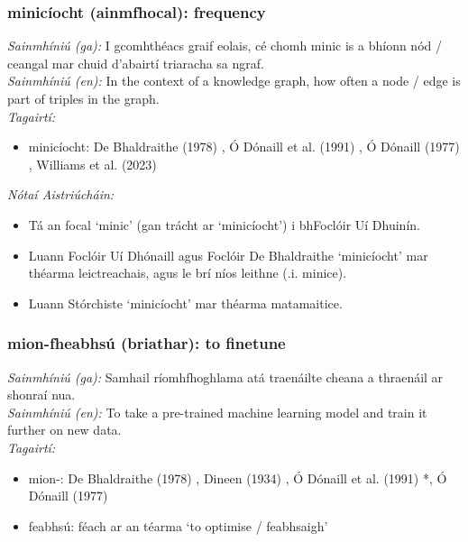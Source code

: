 \subsubsection*{minicíocht (ainmfhocal): frequency}
 \noindent \textit{Sainmhíniú (ga):} I gcomhthéacs graif eolais, cé chomh minic is a bhíonn nód / ceangal mar chuid d'abairtí triaracha sa ngraf.
\\
 \noindent \textit{Sainmhíniú (en):} In the context of a knowledge graph, how often a node / edge is part of triples in the graph.
\\
 \noindent \textit{Tagairtí:}
\begin{itemize}
	\item minicíocht: De Bhaldraithe (1978) \cite{de-bhaldraithe}, Ó Dónaill et al. (1991) \cite{focloir-beag}, Ó Dónaill (1977) \cite{odonaill}, Williams et al. (2023) \cite{storchiste}
\end{itemize}

 \noindent \textit{Nótaí Aistriúcháin:}
\begin{itemize}
	\item Tá an focal `minic' (gan trácht ar `minicíocht') i bhFoclóir Uí Dhuinín.
	\item Luann Foclóir Uí Dhónaill agus Foclóir De Bhaldraithe `minicíocht' mar théarma leictreachais, agus le brí níos leithne (.i. minice).
	\item Luann Stórchiste `minicíocht' mar théarma matamaitice.
\end{itemize}


\subsubsection*{mion-fheabhsú (briathar): to finetune}
 \noindent \textit{Sainmhíniú (ga):} Samhail ríomhfhoghlama atá traenáilte cheana a thraenáil ar shonraí nua.
\\
 \noindent \textit{Sainmhíniú (en):} To take a pre-trained machine learning model and train it further on new data.
\\
 \noindent \textit{Tagairtí:}
\begin{itemize}
	\item mion-: De Bhaldraithe (1978) \cite{de-bhaldraithe}, Dineen (1934) \cite{dineen}, Ó Dónaill et al. (1991) \cite{focloir-beag}*, Ó Dónaill (1977) \cite{odonaill}
	\item feabhsú: féach ar an téarma `to optimise / feabhsaigh'
\end{itemize}


